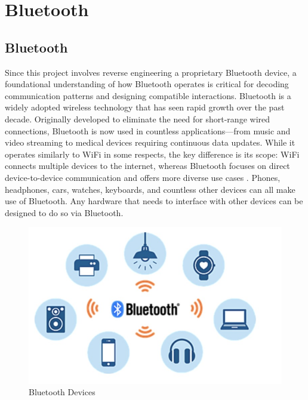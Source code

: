 \chapter{Bluetooth}\label{text}
\section{Bluetooth}
Since this project involves reverse engineering a proprietary Bluetooth device, a foundational understanding of how Bluetooth operates is critical for decoding communication patterns and designing compatible interactions. Bluetooth is a widely adopted wireless technology that has seen rapid growth over the past decade. Originally developed to eliminate the need for short-range wired connections, Bluetooth is now used in countless applications—from music and video streaming to medical devices requiring continuous data updates. 
While it operates similarly to WiFi in some respects, the key difference is its scope: WiFi connects multiple devices to the internet, whereas Bluetooth focuses on direct device-to-device communication and offers more diverse use cases \cite{intelBLEguide}. Phones, headphones, cars, watches, keyboards, and countless other devices can all make use of Bluetooth. Any hardware that needs to interface with other devices can be designed to do so via Bluetooth.

\begin{figure}[h]
    \centering
    \includegraphics[scale=.5]{bluetoothdevices.png}
    \caption{Bluetooth Devices}
    \label{fig:bluetoothdevices}
\end{figure}
    
